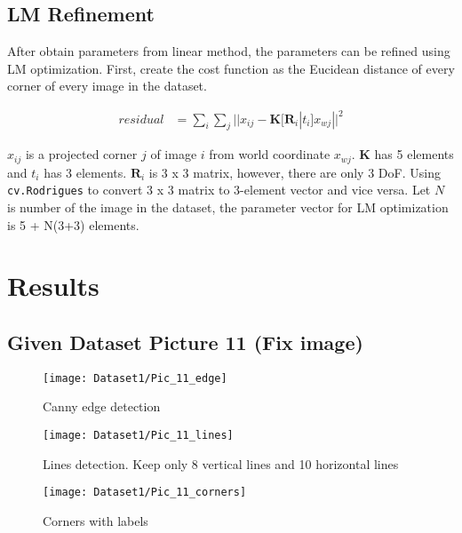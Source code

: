 \documentclass[11pt]{article}
\begin{document}

\subsection*{LM Refinement}

After obtain parameters from linear method, the parameters can be refined using LM optimization. First, create the cost function as the Eucidean distance of every corner of every image in the dataset. 

\begin{align*}
residual  &= \sum_i \sum_j ||x_{ij} - \mathbf{K}[\mathbf{R}_i|t_i] x_{wj}||^2
\end{align*}

$x_{ij}$ is a projected corner $j$ of image $i$ from world coordinate $x_{wj}$. $\mathbf{K}$ has 5 elements and $t_i$ has 3 elements. $\mathbf{R}_i$ is 3 x 3 matrix, however, there are only 3 DoF. Using \lstinline{cv.Rodrigues} to convert 3 x 3 matrix to 3-element vector and vice versa. Let $N$ is number of the image in the dataset, the parameter vector for LM optimization is 5 + N(3+3) elements.

\section*{Results}

\subsection*{Given Dataset Picture 11 (Fix image)}

\begin{figure}[H]
\centering
\texttt{[image: Dataset1/Pic\_11\_edge]}
\caption{Canny edge detection}
\label{}
\end{figure}

\begin{figure}[H]
\centering
\texttt{[image: Dataset1/Pic\_11\_lines]}
\caption{Lines detection. Keep only 8 vertical lines and 10 horizontal lines}
\label{}
\end{figure}

\begin{figure}[H]
\centering
\texttt{[image: Dataset1/Pic\_11\_corners]}
\caption{Corners with labels}
\label{}
\end{figure}
\end{document}
